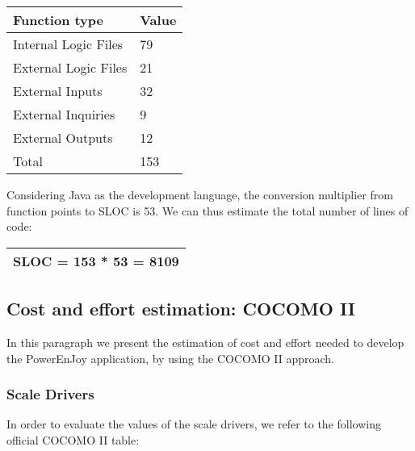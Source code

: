 \begin{table}[H]
	\centering
	\begin{tabular}{| m{3.8cm} | m{1.2cm} |}
		\hline
		\textbf{Function type} & \textbf{Value} \\
		\hline
		Internal Logic Files & 79\\
		External Logic Files & 21\\
		External Inputs & 32\\
		External Inquiries & 9\\
		External Outputs & 12\\
		\hline
		Total & 153\\
		\hline
	\end{tabular}
\end{table}

Considering Java as the development language, the conversion multiplier from function points to SLOC is 53.
We can thus estimate the total number of lines of code:

\begin{table}[H]
	\centering
	\begin{tabular}{| m{13cm} |}
		\hline
		SLOC = 153 * 53 = 8109\\
		\hline
	\end{tabular}
\end{table}

\subsection{Cost and effort estimation: COCOMO II}
In this paragraph we present the estimation of cost and effort needed to develop the PowerEnJoy application, by using the COCOMO II approach.

\subsubsection{Scale Drivers}
In order to evaluate the values of the scale drivers, we refer to the following official COCOMO II table:

